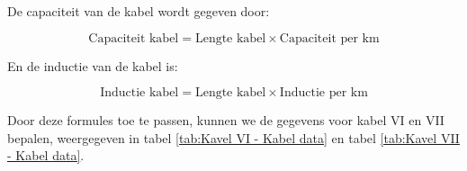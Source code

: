 De capaciteit van de kabel wordt gegeven door:

\begin{equation} \label{eq:29}
\text{{Capaciteit kabel}} = \text{{Lengte kabel}} \times \text{{Capaciteit per km}}
\end{equation} 

En de inductie van de kabel is:

\begin{equation} \label{eq:30}
\text{{Inductie kabel}} = \text{{Lengte kabel}} \times \text{{Inductie per km}}
\end{equation} 

Door deze formules toe te passen, kunnen we de gegevens voor kabel VI en VII bepalen, weergegeven in tabel \ref{tab:Kavel VI - Kabel data} en tabel \ref{tab:Kavel VII - Kabel data}.

